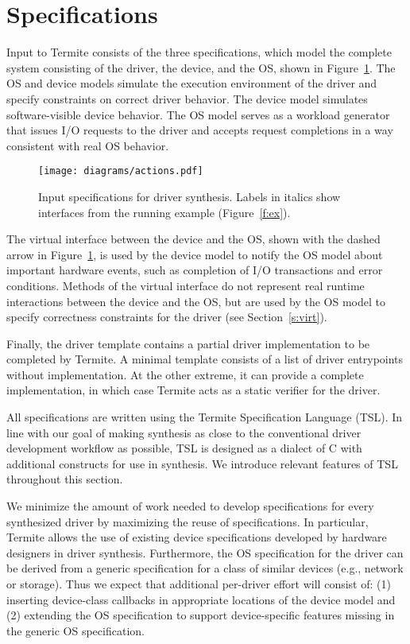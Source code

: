 \documentclass[a4paper,twoside,openright,11pt]{book}
\newcommand{\termite}{Termite\xspace}
\newcommand{\tsl}{TSL\xspace}
\theoremstyle{definition}
\begin{document}
\section{Specifications}

\label{s:specifications}

Input to \termite consists of the three specifications, which model the complete system consisting of the driver, the device, and the OS, shown in Figure~\ref{f:actions}.  The OS and device models simulate the execution environment of the driver and specify constraints on correct driver behavior.  The device model simulates software-visible device behavior.  The OS model serves as a workload generator that issues I/O requests to the driver and accepts request completions in a way consistent with real OS behavior.

\begin{figure}
    \center
    \texttt{[image: diagrams/actions.pdf]}
    \caption{Input specifications for driver synthesis.  
    Labels in italics show interfaces from the running example
    (Figure~\ref{f:ex}).}\label{f:actions}
\end{figure}

The virtual interface between the device and the OS, shown with the dashed arrow in Figure~\ref{f:actions}, is used by the device model to notify the OS model about important hardware events, such as completion of I/O transactions and error conditions.  Methods of the virtual interface do not represent real runtime interactions between the device and the OS, but are used by the OS model to specify correctness constraints for the driver (see Section~\ref{s:virt}).

Finally, the driver template contains a partial driver implementation to be completed by \termite.  A minimal template consists of a list of driver entrypoints without implementation.  At the other extreme, it can provide a complete implementation, in which case \termite acts as a static verifier for the driver.

All specifications are written using the \termite Specification Language (\tsl).  In line with our goal of making synthesis as close to the conventional driver development workflow as possible, \tsl is designed as a dialect of C with additional constructs for use in synthesis.  We introduce relevant features of \tsl throughout this section.

We minimize the amount of work needed to develop specifications for every synthesized driver by maximizing the reuse of specifications.  In particular, \termite allows the use of existing device specifications developed by hardware designers in driver synthesis.  Furthermore, the OS specification for the driver can be derived from a generic specification for a class of similar devices (e.g., network or storage).  Thus we expect that additional per-driver effort will consist of: (1) inserting device-class callbacks in appropriate locations of the device model and (2) extending the OS specification to support device-specific features missing in the  generic OS specification.
\end{document}
